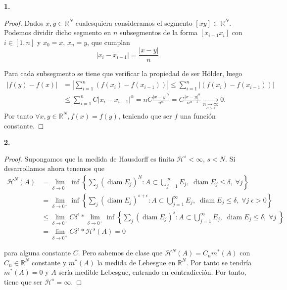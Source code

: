 \documentclass[11pt,a4paper,draft]{article}
\begin{document}
\vskip 5mm
{\bf 1.}
\begin{proof}
  Dados $x, y \in \mathbb{R}^N $ cualesquiera consideramos el segmento $ \left[xy\right] \subset \mathbb{R}^N $. Podemos dividir dicho segmento en $ n $ subsegmentos de la forma  $ \left[x_{i-1} x_i\right] $ con $ i \in \left[1, n\right] $ y $ x_0 = x $, $ x_n = y$, que cumplan
$$
  |x_i - x_{i-1}| = \frac{|x-y|}{n}.
$$

Para cada subsegmento se tiene que verificar la propiedad de ser Hölder, luego
\begin{align*}
  |f(y) - f(x)| &= \left|\sum_{i=1}^n (f(x_i) - f(x_{i-1}))\right| \leq \sum_{i=1}^n \left|(f(x_i) - f(x_{i-1}))\right| \\
  & \leq \sum_{i=1}^n C |x_i - x_{i-1}|^\alpha = n C \frac{|x-y|^\alpha}{n^\alpha} = C \frac{|x-y|^\alpha}{n^{\alpha-1}} \underset{\underset{\alpha>1}{n\to\infty}}{\longrightarrow} 0.
\end{align*}
Por tanto  $ \forall x, y \in \mathbb{R}^N, f(x) = f(y) $, teniendo que ser $ f $ una función constante.
\end{proof}

\newpage
{\bf 2.}
\begin{proof}
  Supongamos que la medida de Hausdorff es finita $ \mathcal H^s < \infty$, $ s<N $.
  Si desarrollamos ahora tenemos que
  \begin{align*}
    \mathcal H^N(A) &= \lim_{\delta \to 0^+} \operatorname{inf} \left\{\sum_j (\operatorname{diam} E_j)^N: A \subset \bigcup_{j=1}^\infty E_j, \; \operatorname{diam} E_j \leq \delta, \; \forall j \right\} \\
    &= \lim_{\delta \to 0^+} \operatorname{inf} \left\{\sum_j (\operatorname{diam} E_j)^{s+\epsilon}: A \subset \bigcup_{j=1}^\infty E_j, \; \operatorname{diam} E_j \leq \delta, \; \forall j \; \epsilon > 0 \right\} \\
    &\leq \lim_{\delta \to 0^+} C \delta^\epsilon *
    \lim_{\delta \to 0^+} \operatorname{inf} \left\{\sum_j (\operatorname{diam} E_j)^s: A \subset \bigcup_{j=1}^\infty E_j, \; \operatorname{diam} E_j \leq \delta, \; \forall j \; \right\}\\
    &= \lim_{\delta \to 0^+} C \delta^\epsilon * \mathcal H^s(A) = 0
  \end{align*}

  para alguna constante $ C $. Pero sabemos de clase que $ \mathcal H^N(A) = C_n m^*(A) $ con $ C_n \in \mathbb R^N $ constante y $ m^*(A) $ la medida de Lebesgue en $ \mathbb R^N $. Por tanto se tendría $ m^*(A) = 0 $ y $ A $ sería medible Lebesgue, entrando en contradicción. Por tanto, tiene que ser $ \mathcal H^s = \infty$.
\end{proof}
\end{document}
